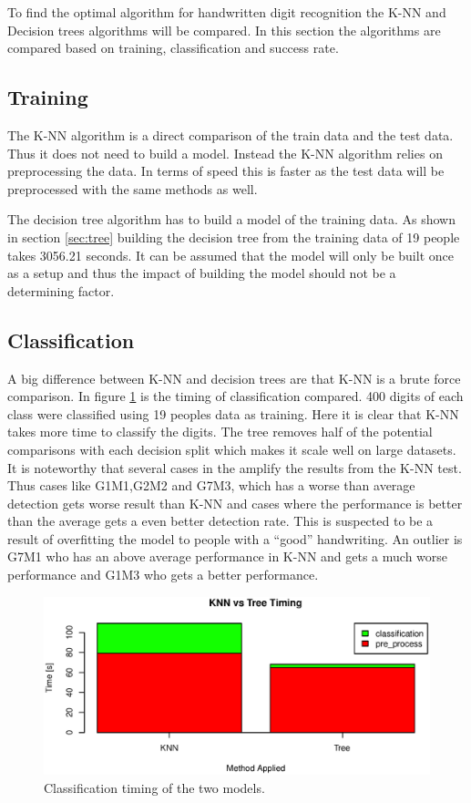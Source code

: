 To find the optimal algorithm for handwritten digit recognition the K-NN and Decision trees algorithms will be compared.
In this section the algorithms are compared based on training, classification and success rate.

\subsection{Training}
The K-NN algorithm is a direct comparison of the train data and the test data.
Thus it does not need to build a model.
Instead the K-NN algorithm relies on preprocessing the data.
In terms of speed this is faster as the test data will be preprocessed with the same methods as well.

The decision tree algorithm has to build a model of the training data. 
As shown in section \ref{sec:tree} building the decision tree from the training data of 19 people takes 3056.21 seconds.
It can be assumed that the model will only be built once as a setup and thus the impact of building the model should not be a determining factor.

\subsection{Classification}
A big difference between K-NN and decision trees are that K-NN is a brute force comparison.
In figure \ref{fig:algo_compare_timing} is the timing of classification compared.
400 digits of each class were classified using 19 peoples data as training.
Here it is clear that K-NN takes more time to classify the digits.
The tree removes half of the potential comparisons with each decision split which makes it scale well on large datasets.
It is noteworthy that several cases in the amplify the results from the K-NN test.
Thus cases like G1M1,G2M2 and G7M3, which has a worse than average detection gets worse result than K-NN 
and cases where the performance is better than the average gets a even better detection rate.
This is suspected to be a result of overfitting the model to people with a ``good'' handwriting.
An outlier is G7M1 who has an above average performance in K-NN and gets a much worse performance and G1M3 who gets a better performance.


\begin{figure}[H]
\centering
\includegraphics[width=\textwidth]{graphics/algo_compare_timing}
\caption{Classification timing of the two models.}
\label{fig:algo_compare_timing}
\end{figure}

